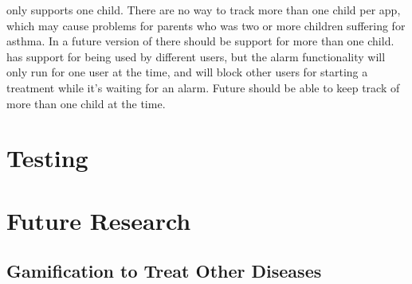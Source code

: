 \app{} only supports one child. There are no way to track more than one child per app, which may cause problems for parents who was two or more children suffering for asthma. In a future version of \app{} there should be support for more than one child. \ab{} has support for being used by different users, but the alarm functionality will only run for one user at the time, and will block other users for starting a treatment while it's waiting for an alarm. Future \ab{} should be able to keep track of more than one child at the time. 


\section{Testing}

\section{Future Research}


\subsection{Gamification to Treat Other Diseases}

